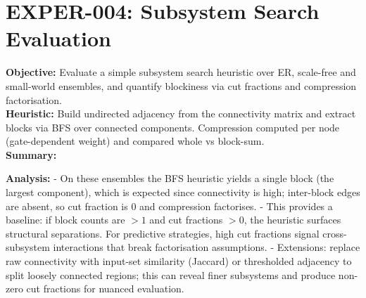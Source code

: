 \documentclass[11pt]{article}
\begin{document}
\section{EXPER-004: Subsystem Search Evaluation}
\textbf{Objective:} Evaluate a simple subsystem search heuristic over ER, scale-free and small-world ensembles, and quantify blockiness via cut fractions and compression factorisation.\\
\textbf{Heuristic:} Build undirected adjacency from the connectivity matrix and extract blocks via BFS over connected components. Compression computed per node (gate-dependent weight) and compared whole vs block-sum.\\
\textbf{Summary:}\\
\begin{center}
\end{center}
\textbf{Analysis:}
- On these ensembles the BFS heuristic yields a single block (the largest component), which is expected since connectivity is high; inter-block edges are absent, so cut fraction is $0$ and compression factorises.
- This provides a baseline: if block counts are $>1$ and cut fractions $>0$, the heuristic surfaces structural separations. For predictive strategies, high cut fractions signal cross-subsystem interactions that break factorisation assumptions.
- Extensions: replace raw connectivity with input-set similarity (Jaccard) or thresholded adjacency to split loosely connected regions; this can reveal finer subsystems and produce non-zero cut fractions for nuanced evaluation.
\end{document}
